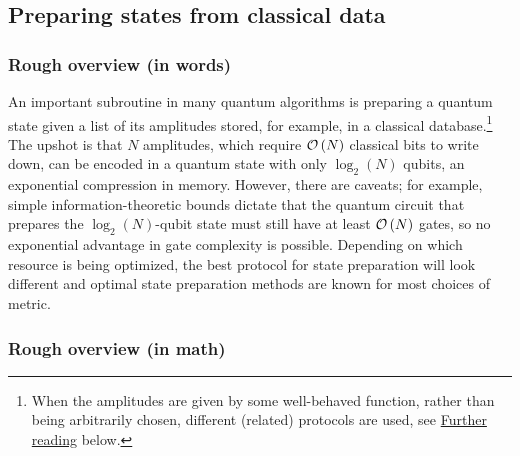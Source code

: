 \begin{refsection}

\subsection{Preparing states from classical data}\label{prim:StatePrepData}

\subsubsection*{Rough overview (in words)}

An important subroutine in many quantum algorithms is preparing a quantum state given a list of its amplitudes stored, for example, in a classical database.\footnote{When the amplitudes are given by some well-behaved function, rather than being arbitrarily chosen, different (related) protocols are used, see \hyperref[StatePrepData-further-reading]{Further reading} below.} The upshot is that $N$ amplitudes, which require $\mathcal{O}\left( N \right)$ classical bits to write down, can be encoded in a quantum state with only $\log_2(N)$ qubits, an exponential compression in memory. However, there are caveats; for example, simple information-theoretic bounds \cite{plesch2011statePrepUniversal} dictate that the quantum circuit that prepares the $\log_2(N)$-qubit state must still have at least $\mathcal{O}\left( N \right)$ gates, so no exponential advantage in gate complexity is possible. Depending on which resource is being optimized, the best protocol for state preparation will look different and optimal state preparation methods are known for most choices of metric. 


\subsubsection*{Rough overview (in math)}


\end{refsection}
